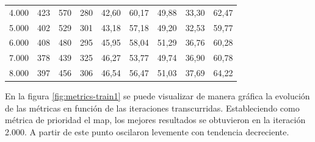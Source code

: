 \begin{table}[ht]
\begin{tabular}{lcccccccc}
4.000               & 423          & 570          & 280          & 42,60                                                             & 60,17                                                          & 49,88                                                           & 33,30                                                               & 62,47                                                             \\
5.000               & 402          & 529          & 301          & 43,18                                                             & 57,18                                                          & 49,20                                                           & 32,53                                                               & 59,77                                                             \\
6.000               & 408          & 480          & 295          & 45,95                                                             & 58,04                                                          & 51,29                                                           & 36,76                                                               & 60,28                                                             \\
7.000               & 378          & 439          & 325          & 46,27                                                             & 53,77                                                          & 49,74                                                           & 36,90                                                               & 60,78                                                             \\
8.000               & 397          & 456          & 306          & 46,54                                                             & 56,47                                                          & 51,03                                                           & 37,69                                                               & 64,22                                                             \\ \hline
\end{tabular}
\end{table}

En la figura \ref{fig:metrics-train1} se puede visualizar de manera gráfica la evolución de las métricas en función de las iteraciones transcurridas. Estableciendo como métrica de prioridad el \gls{map}, los mejores resultados se obtuvieron en la iteración 2.000. A partir de este punto oscilaron levemente con tendencia decreciente.

